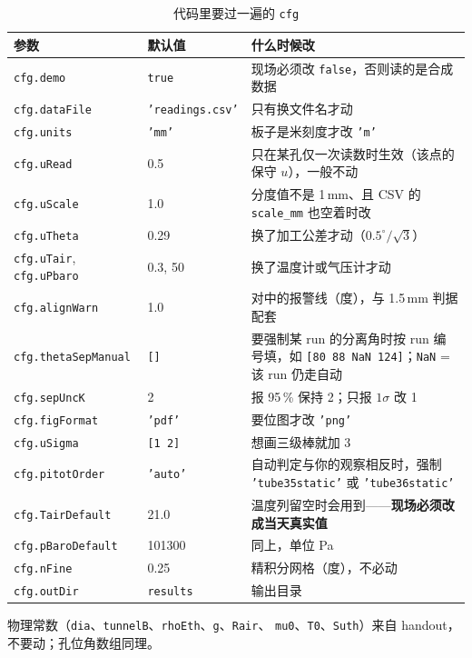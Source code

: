 \documentclass[11pt,a4paper]{ctexart}
\begin{document}
\begin{table}[H]
\centering
\caption{代码里要过一遍的 \texttt{cfg}}
\small
\begin{tabularx}{\textwidth}{@{}p{3.5cm} p{2.8cm} X@{}}
\toprule
参数 & 默认值 & 什么时候改 \\
\midrule
\texttt{cfg.demo} & \texttt{true} & 现场必须改 \texttt{false}，否则读的是合成数据 \\
\texttt{cfg.dataFile} & \texttt{'readings.csv'} & 只有换文件名才动 \\
\texttt{cfg.units} & \texttt{'mm'} & 板子是米刻度才改 \texttt{'m'} \\
\texttt{cfg.uRead} & 0.5 & 只在某孔仅一次读数时生效（该点的保守 $u$），一般不动 \\
\texttt{cfg.uScale} & 1.0 & 分度值不是 1\,mm、且 CSV 的 \texttt{scale\_mm} 也空着时改 \\
\texttt{cfg.uTheta} & 0.29 & 换了加工公差才动（$0.5^\circ/\sqrt{3}$） \\
\texttt{cfg.uTair}, \texttt{cfg.uPbaro} & 0.3, 50 & 换了温度计或气压计才动 \\
\texttt{cfg.alignWarn} & 1.0 & 对中的报警线（度），与 1.5\,mm 判据配套 \\
\texttt{cfg.thetaSepManual} & \texttt{[]} & 要强制某 run 的分离角时按 run 编号填，如 \texttt{[80 88 NaN 124]}；\texttt{NaN} = 该 run 仍走自动 \\
\texttt{cfg.sepUncK} & 2 & 报 95\,\% 保持 2；只报 $1\sigma$ 改 1 \\
\texttt{cfg.figFormat} & \texttt{'pdf'} & 要位图才改 \texttt{'png'} \\
\texttt{cfg.uSigma} & \texttt{[1 2]} & 想画三级棒就加 3 \\
\texttt{cfg.pitotOrder} & \texttt{'auto'} & 自动判定与你的观察相反时，强制 \texttt{'tube35static'} 或 \texttt{'tube36static'} \\
\texttt{cfg.TairDefault} & 21.0 & 温度列留空时会用到——\textbf{现场必须改成当天真实值} \\
\texttt{cfg.pBaroDefault} & 101300 & 同上，单位 Pa \\
\texttt{cfg.nFine} & 0.25 & 精积分网格（度），不必动 \\
\texttt{cfg.outDir} & \texttt{results} & 输出目录 \\
\bottomrule
\end{tabularx}
\end{table}

物理常数（\texttt{dia}、\texttt{tunnelB}、\texttt{rhoEth}、\texttt{g}、\texttt{Rair}、
\texttt{mu0}、\texttt{T0}、\texttt{Suth}）来自 handout，不要动；孔位角数组同理。
\end{document}
